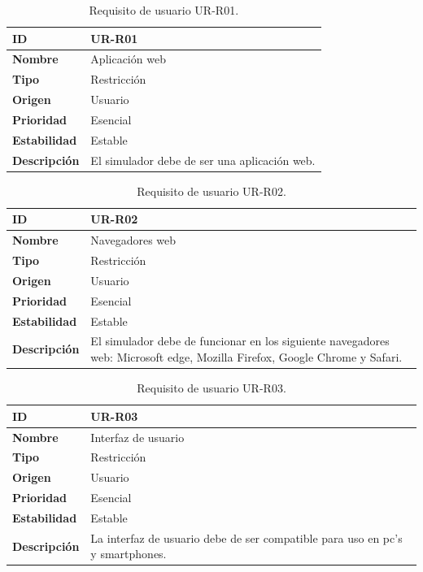 \begin{center}
\begin{table}[htbp]
\centering
\begin{tabular}{@{}p{2.5cm} p{9cm}@{}} 
\toprule
\textbf{ID} 				& UR-R01 \\
\midrule
\textbf{Nombre} 			& Aplicación web\\
\midrule
\textbf{Tipo} 			& Restricción \\
\midrule
\textbf{Origen} 			& Usuario \\
\midrule
\textbf{Prioridad}		& Esencial \\
\midrule
\textbf{Estabilidad} 		& Estable \\
\midrule
\textbf{Descripción} 	& El simulador debe de ser una aplicación web. \\
\bottomrule
\end{tabular}
\caption{Requisito de usuario UR-R01.}
\label{tab:urr01}
\end{table}
\end{center}

\begin{center}
\begin{table}[htbp]
\centering
\begin{tabular}{@{}p{2.5cm} p{9cm}@{}} 
\toprule
\textbf{ID} 				& UR-R02 \\
\midrule
\textbf{Nombre} 			& Navegadores web \\
\midrule
\textbf{Tipo} 			& Restricción \\
\midrule
\textbf{Origen} 			& Usuario \\
\midrule
\textbf{Prioridad}		& Esencial \\
\midrule
\textbf{Estabilidad} 		& Estable \\
\midrule
\textbf{Descripción} 	& El simulador debe de funcionar en los siguiente navegadores web: Microsoft edge, Mozilla Firefox, Google Chrome y Safari. \\
\bottomrule
\end{tabular}
\caption{Requisito de usuario UR-R02.}
\label{tab:urr02}
\end{table}
\end{center}

\begin{center}
\begin{table}[htbp]
\centering
\begin{tabular}{@{}p{2.5cm} p{9cm}@{}} 
\toprule
\textbf{ID} 				& UR-R03 \\
\midrule
\textbf{Nombre} 			& Interfaz de usuario \\
\midrule
\textbf{Tipo} 			& Restricción \\
\midrule
\textbf{Origen} 			& Usuario \\
\midrule
\textbf{Prioridad}		& Esencial \\
\midrule
\textbf{Estabilidad} 		& Estable \\
\midrule
\textbf{Descripción} 	& La interfaz de usuario debe de ser compatible para uso en pc's y smartphones. \\
\bottomrule
\end{tabular}
\caption{Requisito de usuario UR-R03.}
\label{tab:urr03}
\end{table}
\end{center}


